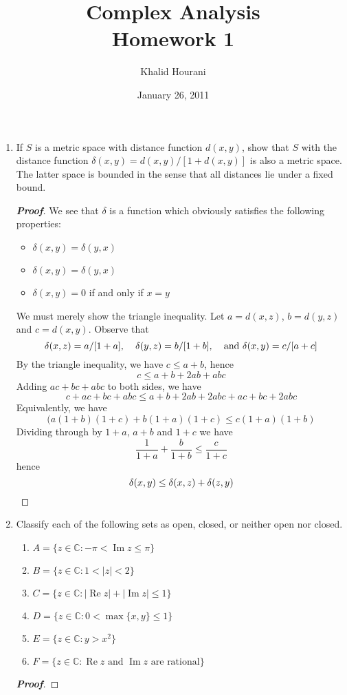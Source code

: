 \documentclass[12pt,leqno]{book}
\title{Complex Analysis\\\large Homework 1}
\date{January 26, 2011}
\author{Khalid Hourani}
\theoremstyle{definition}
\newcommand{\re}{\operatorname{Re}}
\newcommand{\im}{\operatorname{Im}}
\newcommand{\C}{\mathbb{C}}
\newenvironment{Proof}{\begin{proof}[\textnormal{\textbf{Proof}}]}{\end{proof}}
\begin{document}
 \begin{titlepage}
  \maketitle
 \end{titlepage}

\begin{enumerate}
 \item If $S$ is a metric space with distance function $d(x,y)$, show that $S$ with the distance function $\delta(x,y)=d(x,y)/[1+d(x,y)]$ is also a metric space. The latter space is bounded in the sense that all distances lie under a fixed bound.
  \begin{Proof}
   We see that $\delta$ is a function which obviously satisfies the following properties:
  \begin{itemize}
   \item $\delta(x,y)=\delta(y,x)$
   \item $\delta(x,y)=\delta(y,x)$
   \item $\delta(x,y)=0$ if and only if $x=y$
  \end{itemize}
 We must merely show the triangle inequality. Let $a=d(x,z)$, $b=d(y,z)$ and $c=d(x,y)$. Observe that \[\delta(x,z)=a/[1+a],\hskip.15in \delta(y,z)=b/[1+b],\hskip.15in \text{and }\delta(x,y)=c/[a+c]\] By the triangle inequality, we have $c\leq a+b$, hence \[c\leq a+b+2ab+abc\] Adding $ac+bc+abc$ to both sides, we have \[c+ac+bc+abc\leq a+b+2ab+2abc+ac+bc+2abc\] Equivalently, we have \[(a(1+b)(1+c)+b(1+a)(1+c)\leq c(1+a)(1+b)\] Dividing through by $1+a$, $a+b$ and $1+c$ we have \[\frac{1}{1+a}+\frac{b}{1+b}\leq\frac{c}{1+c}\] hence \[\delta(x,y)\leq\delta(x,z)+\delta(z,y)\qedhere\] 
  \end{Proof}
 \item Classify each of the following sets as open, closed, or neither open nor closed.
  \begin{enumerate}
   \item $A=\{z\in\C:-\pi<\im z\leq\pi\}$
   \item $B=\{z\in\C:1<|z|<2\}$
   \item $C=\{z\in\C:|\re z|+|\im z|\leq1\}$
   \item $D=\{z\in\C:0<\max\{x,y\}\leq1\}$
   \item $E=\{z\in\C:y>x^2\}$
   \item $F=\{z\in\C:\re z\text{ and }\im z\text{ are rational}\}$
  \end{enumerate}
\begin{Proof}\indent

\end{Proof}
\end{enumerate}
\end{document}
